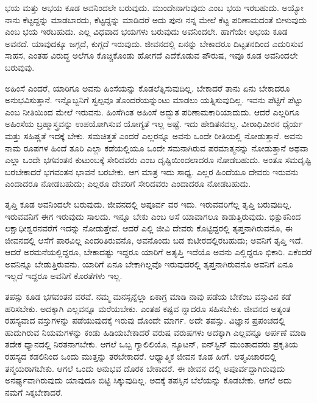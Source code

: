 ಭಯ ಮತ್ತು ಅಭಯ ಕೂಡ ಅವನಿಂದಲೇ ಬರುವುದು. ಮುಂದೇನಾಗುವುದು ಎಂಬ ಭಯ ಇರಬಹುದು. ಅಯ್ಯೋ ನಾನು ಕೆಟ್ಟದ್ದನ್ನು ಮಾಡಬಾರದು, ಕೆಟ್ಟದ್ದನ್ನು ಮಾಡಿದರೆ ಅದು ಪುನಃ ನನ್ನ ಮೇಲೆ ಕೆಟ್ಟ ಪರಿಣಾಮದಂತೆ ಬೀಳುವುದು ಎಂಬ ಭಯ ಇರಬಹುದು. ಎಲ್ಲ ವಿಧವಾದ ಭಯಗಳು ಬರುವುದು ಅವನಿಂದಲೇ. ಹಾಗೆಯೇ ಅಭಯ ಕೂಡ ಅವನದೆ. ಯಾವುದಕ್ಕೂ ಜಗ್ಗದೆ, ಕುಗ್ಗದೆ ಇರುವುದು. ಜೀವನದಲ್ಲಿ ಏನನ್ನು ಬೇಕಾದರೂ ದಿಟ್ಟತನದಿಂದ ಎದುರಿಸುವ ಸಾಹಸ, ಎಂತಹ ವಿರುದ್ಧ ಅಲೆಗೂ ಕೊಚ್ಚಿಕೊಂಡು ಹೋಗದೆ ಎದೆಕೊಡುವ ಪೌರುಷ, ಇವೂ ಕೂಡ ಅವನಿಂದಲೇ ಬರುವುವು.

ಅಹಿಂಸೆ ಎಂದರೆ, ಯಾರಿಗೂ ಅವನು ಹಿಂಸೆಯನ್ನು ಕೊಡಲೆತ್ನಿಸುವುದಿಲ್ಲ. ಬೇಕಾದರೆ ತಾನು ಏನು ಬೇಕಾದರೂ ಅನುಭವಿಸುತ್ತಾನೆ. ಇನ್ನೊಬ್ಬನಿಗೆ ಸ್ವಲ್ಪವೂ ತೊಂದರೆಯನ್ನುಂಟು ಮಾಡಲು ಯತ್ನಿಸುವುದಿಲ್ಲ. ಇವನು ಪೆಟ್ಟಿಗೆ ಪೆಟ್ಟು ಎಂಬ ನೀತಿಯಿಂದ ಮೇಲೆ ಇರುವನು. ಹಿಂಸೆಗಿಂತ ಅಹಿಂಸೆ ಅದ್ಭುತ ಪರಿಣಾಮಕಾರಿಯಾದುದು. ಆದರೆ ಎಲ್ಲರಿಗೂ ಅಹಿಂಸೆಯ ಬ್ರಹ್ಮಾಸ್ತ್ರವನ್ನು ಉಪಯೋಗಿಸುವ ಯೋಗ್ಯತೆ ಇಲ್ಲ ಅಷ್ಟೆ. ಇದು ಹೇಡಿತನವಲ್ಲ. ವೀರಾಧಿವೀರನ ಧೈರ್ಯ ಮತ್ತು ಸಹಿಷ್ಣತೆ ಇದಕ್ಕೆ ಬೇಕು. ಸಮಚಿತ್ತತೆ ಎಂದರೆ ಎಲ್ಲರನ್ನೂ ಅವನು ಒಂದೇ ರೀತಿಯಲ್ಲಿ ನೋಡುತ್ತಾನೆ. ಅವನು ನಾಮ ರೂಪಗಳ ಹಿಂದೆ ತೂರಿ ಎಲ್ಲಾ ಕಡೆಯಲ್ಲಿಯೂ ಒಂದೇ ಸಮನಾಗಿರುವ ಪರಮಾತ್ಮನನ್ನು ನೋಡುತ್ತಾನೆ ಅಥವಾ ಎಲ್ಲಾ ಒಂದೇ ಭಗವಂತನ ಕುಟುಂಬಕ್ಕೆ ಸೇರಿದವರು ಎಂಬ ದೃಷ್ಟಿಯಿಂದಲಾದರೂ ನೋಡಬಹುದು. ಅಂತೂ ಸಮದೃಷ್ಟಿ ಬರಬೇಕಾದರೆ ಭಗವಂತನ ಭಾವನೆ ಬರಬೇಕು. ಆಗ ಮಾತ್ರ ಇದು ಸಾಧ್ಯ. ಎಲ್ಲರ ಹಿಂದೆಯೂ ದೇವರು ಇರುವನು ಎಂದಾದರೂ ನೋಡಬಹುದು; ಎಲ್ಲರೂ ದೇವರಿಗೆ ಸೇರಿದವರು ಎಂದಾದರೂ ನೋಡಬಹುದು.

ತೃಪ್ತಿ ಕೂಡ ಅವನಿಂದಲೇ ಬರುವುದು. ಜೀವನದಲ್ಲಿ ಅಪೂರ್ವ ವರ ಇದು. ಇರುವವರಿಗೆಲ್ಲ ತೃಪ್ತಿ ಬರುವುದಿಲ್ಲ. ಇರುವವನಿಗೆ ಈಗ ಇರುವುದು ಸಾಲದು. ಇನ್ನೂ ಬೇಕು ಎಂಬ ಆಸೆ ಯಾವಾಗಲೂ ಕಾಡುತ್ತಿರುವುದು. ಭಿಕ್ಷುಕನಿಂದ ಲಕ್ಷಾಧೀಶ್ವರನವರೆಗೆ ಇದನ್ನು ನೋಡುತ್ತೇವೆ. ಆದರೆ ಎಲ್ಲಿ ಜೀವಿ ದೇವರು ಕೊಟ್ಟಿದ್ದರಲ್ಲಿ ತೃಪ್ತನಾಗಿರುವನೊ, ಈ ಜೀವನದಲ್ಲಿ ಆಸೆಗೆ ಪಾರವಿಲ್ಲ ಎಂದರಿತಿರುವನೊ, ಅವನೊಂದು ಬಡ ಕುಟೀರದಲ್ಲಿರಬಹುದು; ಅವನಿಗೆ ತೃಪ್ತಿ ಇದೆ. ಆದರೆ ಅರಮನೆಯಲ್ಲಿದ್ದರೂ, ಬೇಕಾದಷ್ಟು ಇದ್ದರೂ ಯಾರಿಗೆ ಅತೃಪ್ತಿ ಇದೆಯೊ ಅವನು ಎಲ್ಲಿದ್ದರೂ ಭಿಕಾರಿ. ಏಕೆಂದರೆ ಅವನಿನ್ನೂ ಬೇಡುತ್ತಿರುವನು. ಯಾರಿಗೆ ಏನೂ ಬೇಕಾಗಿಲ್ಲವೊ ಇರುವುದರಲ್ಲಿ ತೃಪ್ತನಾಗಿರುವನೊ ಅವನಿಗೆ ಏನೂ ಇಲ್ಲದೆ ಇದ್ದರೂ ಅವನಿಗೆ ಕೊರತೆಗಳು ಇಲ್ಲ.

ತಪಸ್ಸು ಕೂಡ ಭಗವಂತನ ವರವೆ. ನಮ್ಮ ಮನಸ್ಸನ್ನೆಲ್ಲಾ ಏಕಾಗ್ರ ಮಾಡಿ ನಾವು ಪಡೆಯ ಬೇಕೆಂಬ ವಸ್ತುವಿನ ಕಡೆ ಹರಿಸಬೇಕು. ಅದಕ್ಕಾಗಿ ಎಲ್ಲವನ್ನೂ ಮರೆಯಬೇಕು. ಎಂತಹ ಕಷ್ಟವ ನ್ನಾದರೂ ಸಹಿಸಬೇಕು. ಜೀವನದ ಅತ್ಯಂತ ರಹಸ್ಯವಾದ ವಸ್ತುಗಳನ್ನು ಪಡೆಯುವುದಕ್ಕೆ ಇರುವು ದೊಂದೇ ಮಾರ್ಗ. ಅದೇ ತಪಸ್ಸು. ವಿಜ್ಞಾನ ಪ್ರಪಂಚದಲ್ಲಿ ಹುದುಗಿರುವ ನಿಯಮಗಳನ್ನು ಕಂಡು ಹಿಡಿಯಬೇಕಾದರೆ ವರುಷ ವರುಷಗಳು ಅದಕ್ಕಾಗಿ ಎಲ್ಲವನ್ನೂ ಅರ್ಪಣೆ ಮಾಡಿ ತದೇಕ ಧ್ಯಾನದಲ್ಲಿ ನಿರತನಾಗಬೇಕು. ಆಗಲೆ ಒಬ್ಬ ಗ್ಯಾಲಿಲಿಯೊ, ನ್ಯೂಟನ್, ಐನ್​ಸ್ಟಿನ್ ಮುಂತಾದವರು ಪ್ರಕೃತಿಯ ರಹಸ್ಯದ ಕಡಲಿನಿಂದ ಒಂದು ಮುತ್ತನ್ನು ತರಬೇಕಾದರೆ. ಆಧ್ಯಾತ್ಮಿಕ ಜೀವನ ಕೂಡ ಹೀಗೆ. ಆತ್ಮವಿಚಾರದಲ್ಲಿ ತನ್ಮಯರಾಗಬೇಕು. ಆಗಲೆ ಒಂದು ಅನುಭವ ದೊರಕ ಬೇಕಾದರೆ. ಈ ಜೀವನ ದಲ್ಲಿ ಅಪೂರ್ವದ್ದಾಗಿರುವುದು ಅನರ್ಘ್ಯವಾಗಿರುವುದು ಯಾವುದೂ ಬಿಟ್ಟಿ ಸಿಕ್ಕುವುದಿಲ್ಲ. ಅದಕ್ಕೆ ತಪಸ್ಸಿನ ಬೆಲೆಯನ್ನು ಕೊಡಬೇಕು. ಆಗಲೆ ಅದು ನಮಗೆ ಸಿಕ್ಕಬೇಕಾದರೆ.


